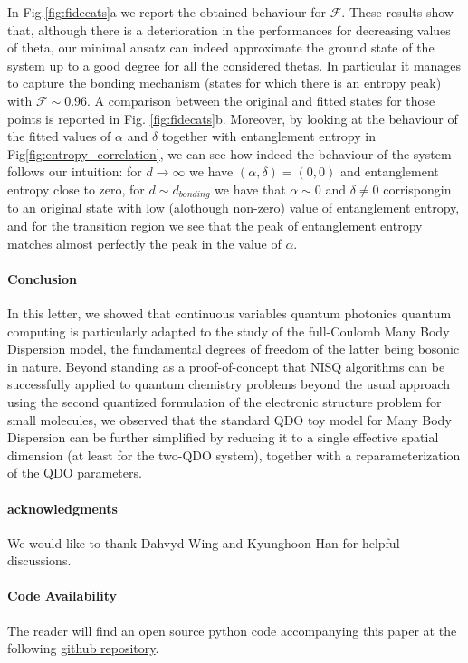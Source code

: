 \documentclass[reprint, amsmath, amssymb, floatfix, aps, pra]{revtex4-2}
\begin{document}
In Fig.\ref{fig:fidecats}a we report the obtained behaviour for $\mathcal{F}$. These results show that, although there is a deterioration in the performances for decreasing values of theta, our minimal ansatz can indeed approximate the ground state of the system up to a good degree for all the considered thetas. In particular it manages to capture the bonding mechanism (states for which there is an entropy peak) with $\mathcal{F}\sim 0.96$. A comparison between the original and fitted states for those points is reported in Fig. \ref{fig:fidecats}b. Moreover, by looking at the behaviour of the fitted values of $\alpha$ and $\delta$ together with entanglement entropy in Fig\ref{fig:entropy_correlation}, we can see how indeed the behaviour of the system follows our intuition: for $d\rightarrow\infty$ we have $(\alpha, \delta) = (0,0)$ and entanglement entropy close to zero, for $d\sim d_{bonding}$ we have that $\alpha \sim 0$ and $\delta\neq 0$ corrispongin to an original state with low (alothough non-zero) value of entanglement entropy, and for the transition region we see that the peak of entanglement entropy matches almost perfectly the peak in the value of $\alpha$.

\paragraph*{Conclusion}

    In this letter, we showed that continuous variables quantum photonics quantum computing is particularly adapted to the study of the full-Coulomb Many Body Dispersion model, the fundamental degrees of freedom of the latter being bosonic in nature. Beyond standing as a proof-of-concept that NISQ algorithms can be successfully applied to quantum chemistry problems beyond the usual approach using the second quantized formulation of the electronic structure problem for small molecules, we observed that the standard QDO toy model for Many Body Dispersion can be further simplified by reducing it to a single effective spatial dimension (at least for the two-QDO system), together with a reparameterization of the QDO parameters.
    \newline

\paragraph*{acknowledgments}

    We would like to thank Dahvyd Wing and Kyunghoon Han for helpful discussions.
    \newline

\paragraph*{Code Availability}

The reader will find an open source python code accompanying this paper at the following \href{https://github.com/MatthieuSarkis/qdo}{github repository}.

\appendix



\end{document}
